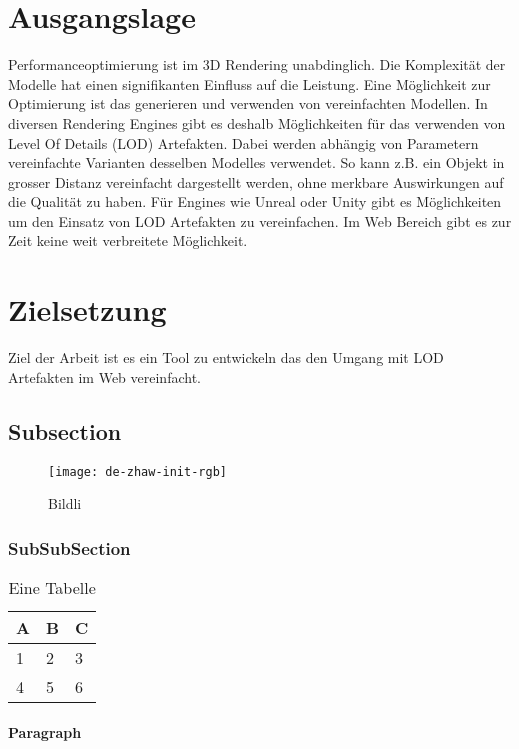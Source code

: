\section{Ausgangslage}

Performanceoptimierung ist im 3D Rendering unabdinglich. Die Komplexität der Modelle hat einen signifikanten Einfluss auf die Leistung.
Eine Möglichkeit zur Optimierung ist das generieren und verwenden von vereinfachten Modellen. In diversen Rendering Engines gibt es deshalb Möglichkeiten für das verwenden von Level Of Details (LOD) Artefakten. Dabei werden abhängig von Parametern vereinfachte Varianten desselben Modelles verwendet. So kann z.B. ein Objekt in grosser Distanz vereinfacht dargestellt werden, ohne merkbare Auswirkungen auf die Qualität zu haben.
Für Engines wie Unreal oder Unity gibt es Möglichkeiten um den Einsatz von LOD Artefakten zu vereinfachen. Im Web Bereich gibt es zur Zeit keine weit verbreitete Möglichkeit.

\section{Zielsetzung}
Ziel der Arbeit ist es ein Tool zu entwickeln das den Umgang mit LOD Artefakten im Web vereinfacht.

\subsection{Subsection}
\lipsum[1] \cite{quelle1}

\begin{figure}[H]
\centering
\texttt{[image: de-zhaw-init-rgb]}
\caption{Bildli}
\label{fig:bildli1}
\end{figure}


\subsubsection{SubSubSection}
\lipsum[1]
\begin{table}[H]
\centering
\caption{Eine Tabelle}
\label{tab:my-table}
\begin{tabular}{|l|l|l|}
\hline
\textbf{A} & \textbf{B} & \textbf{C} \\ \hline
1          & 2          & 3          \\ \hline
4          & 5          & 6          \\ \hline
\end{tabular}
\end{table}

\paragraph{Paragraph}
\lipsum[1]

 


